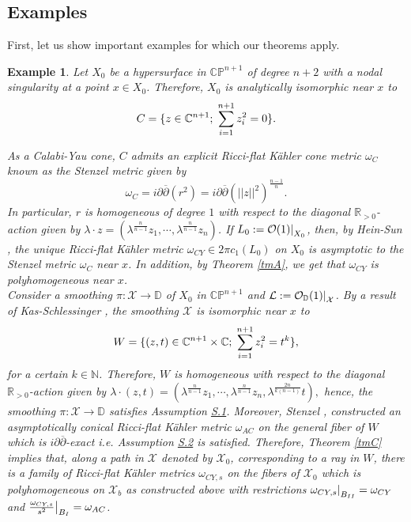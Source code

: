 \documentclass[a4paper,11pt]{article}
\newcounter{mythm}[section]
\newtheorem{ex}[mythm]{Example}
\def\C{\mathbb{C}}
\def\R{\mathbb{R}}
\def\N{\mathbb{N}}
\newcommand\restr[2]{{%
  \left.\kern-\nulldelimiterspace %
  #1 %
  \littletaller %
  \right|_{#2} %
  }}
\newcommand{\littletaller}{\mathchoice{\vphantom{\big|}}{}{}{}}
\begin{document}
\subsection{Examples} 
First, let us show important examples for which our theorems apply.
\begin{ex}
Let $X_0$ be a hypersurface in $\mathbb{CP}^{n+1}$ of degree $n+2$ with a nodal singularity at a point $x \in X_0$. Therefore, $X_0$ is analytically isomorphic near $x$ to
$$
C = \{ z \in \C^{n+1}; \hspace{0.1cm} \sum_{i=1}^{n+1} z_i^2 =0 \}.
$$

As a Calabi-Yau cone, $C$ admits an explicit Ricci-flat Kähler cone metric $\omega_C$ known as the \emph{Stenzel metric} \cite{stenzel_ricci-flat_1993, candelas_comments_1990} given by 
$$
\omega_C = i \partial \overline{\partial}(r^2) = i \partial \overline{\partial} \left( ||z||^{2}\right)^{\frac{n-1}{n}}.
$$
In particular, $r$ is homogeneous of degree $1$ with respect to the diagonal $\R_{>0}$-action given by $
\lambda \cdot z = (\lambda^{\frac{n}{n-1}}z_1, \cdots, \lambda^{\frac{n}{n-1}}z_n)$. If $L_0 := \restr{\mathcal{O}(1)}{X_0}$, then, by Hein-Sun \cite{hein_calabi-yau_2017}, the unique Ricci-flat Kähler metric $\omega_{CY} \in 2 \pi c_1(L_0)$ on $X_0$ is asymptotic to the Stenzel metric $\omega_C$ near $x$. In addition, by Theorem \ref{tmA}, we get that $\omega_{CY}$ is polyhomogeneous near $x$.\\

Consider a smoothing $\pi :\mathcal{X} \rightarrow \mathbb{D}$ of $X_0$ in $\mathbb{CP}^{n+1}$ and $\mathcal{L} := \restr{\mathcal{O}_{\mathbb{D}}(1)}{\mathcal{X}}$. By a result of Kas-Schlessinger \cite{KasSchlessinger}, the smoothing $\mathcal{X}$ is isomorphic near $x$ to $$
W = \{(z,t) \in \C^{n+1}  \times \C; \hspace{0.1cm} \sum_{i=1}^{n+1} z_i^2 = t^k \}, 
$$
for a certain $k \in \N$. Therefore, $W$ is homogeneous with respect to the diagonal $\R_{>0}$-action given by $
\lambda \cdot (z,t) = (\lambda^{\frac{n}{n-1}}z_1, \cdots, \lambda^{\frac{n}{n-1}}z_n, \lambda^{\frac{2n}{k(n-1)}} t),$ hence, the smoothing $\pi :\mathcal{X} \rightarrow \mathbb{D}$ satisfies Assumption \hyperlink{S.1}{S.1}. Moreover, Stenzel \cite{stenzel_ricci-flat_1993}, constructed an asymptotically conical Ricci-flat Kähler metric $\omega_{AC}$ on the general fiber of $W$ which is $i \partial \overline{\partial}$-exact i.e. Assumption \hyperlink{S.2}{S.2} is satisfied. Therefore, Theorem \ref{tmC} implies that, along a path in $\mathcal{X}$ denoted by $\mathcal{X}_0$, corresponding to a ray in $W$, there is a family of Ricci-flat Kähler metrics $\omega_{CY,s}$ on the fibers of $\mathcal{X}_0$ which is polyhomogeneous on $\mathcal{X}_b$ as constructed above with restrictions $\restr{\omega_{CY, s}}{B_{II}} = \omega_{CY}$ and $\restr{\frac{\omega_{CY, s}}{s^2}}{B_I} = \omega_{AC}$.
\end{ex}
\end{document}
